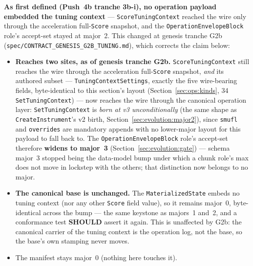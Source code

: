 \documentclass[11pt,letterpaper]{report}
\newcommand{\tablenums}[1]{{\addfontfeatures{Numbers={Lining,Tabular}}#1}}
\newcommand{\SHOULD}{\textbf{SHOULD}}
\begin{document}
\textbf{As first defined (Push~4b tranche 3b-i), no operation payload
embedded the tuning context} --- \texttt{ScoreTuningContext} reached the
wire only through the acceleration full-\texttt{Score} snapshot, and the
\texttt{OperationEnvelopeBlock} role's accept-set stayed at major~2. This
changed at genesis tranche G2b
(\texttt{spec/CONTRACT\_GENESIS\_G2B\_TUNING.md}), which corrects the claim
below:

\begin{itemize}
  \item \textbf{Reaches two sites, as of genesis tranche G2b.}
    \texttt{ScoreTuningContext} still reaches the wire through the
    acceleration full-\texttt{Score} snapshot, \emph{and} its authored
    subset --- \texttt{TuningContextSettings}, exactly the five
    wire-bearing fields, byte-identical to this section's layout
    (Section~\ref{sec:ops:kinds}, \tablenums{34}
    \texttt{SetTuningContext}) --- now reaches the wire through the
    canonical operation layer: \texttt{SetTuningContext} is \emph{born at
    v3 unconditionally} (the same shape as \texttt{CreateInstrument}'s v2
    birth, Section~\ref{sec:evolution:major2}), since \texttt{smufl} and
    \texttt{overrides} are mandatory appends with no lower-major layout for
    this payload to fall back to. The \texttt{OperationEnvelopeBlock}
    role's accept-set therefore \textbf{widens to major~3}
    (Section~\ref{sec:evolution:gate}) --- schema major~3 stopped being the
    data-model bump under which a chunk role's max does not move in
    lockstep with the others; that distinction now belongs to no major.
  \item \textbf{The canonical base is unchanged.} The
    \texttt{MaterializedState} embeds no tuning context (nor any other
    \texttt{Score} field value), so it remains major~0, byte-identical
    across the bump --- the same keystone as majors~1 and~2, and a
    conformance test \SHOULD{} assert it again. This is unaffected by G2b:
    the canonical carrier of the tuning context is the operation log, not
    the base, so the base's own stamping never moves.
  \item The manifest stays major~0 (nothing here touches it).
\end{itemize}
\end{document}
